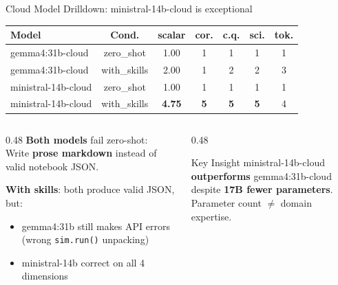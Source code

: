 \documentclass[aspectratio=169,10pt]{beamer}
\begin{document}
\begin{frame}{Cloud Model Drilldown: ministral-14b-cloud is exceptional}
  \centering
  \renewcommand{\arraystretch}{1.3}
  \begin{tabular}{l c c c c c c}
    \toprule
    \textbf{Model} & \textbf{Cond.} & \textbf{scalar} & \textbf{cor.} & \textbf{c.q.} & \textbf{sci.} & \textbf{tok.} \\
    \midrule
    gemma4:31b-cloud & zero\_shot & 1.00 & 1 & 1 & 1 & 1 \\
    gemma4:31b-cloud & with\_skills & 2.00 & 1 & 2 & 2 & 3 \\
    \midrule
    
    ministral-14b-cloud & zero\_shot & 1.00 & 1 & 1 & 1 & 1 \\
    
    ministral-14b-cloud & with\_skills & \textbf{4.75} & \textbf{5} & \textbf{5} & \textbf{5} & 4 \\
    \bottomrule
  \end{tabular}
  
  \vspace{0.4cm}
  \begin{columns}
    \begin{column}{0.48\textwidth}
      \textbf{Both models} fail zero-shot:\\
      Write \textbf{prose markdown} instead of valid notebook JSON.
      
      \vspace{0.2cm}
      \textbf{With skills}: both produce valid JSON, but:
      \begin{itemize}
        \item gemma4:31b still makes API errors (wrong \texttt{sim.run()} unpacking)
        \item ministral-14b correct on all 4 dimensions
      \end{itemize}
    \end{column}
    \begin{column}{0.48\textwidth}
      \begin{alertblock}{Key Insight}
        ministral-14b-cloud \textbf{outperforms} gemma4:31b-cloud\\
        despite \textbf{17B fewer parameters}.\\
        Parameter count $\neq$ domain expertise.
      \end{alertblock}
    \end{column}
  \end{columns}
\end{frame}
\end{document}
